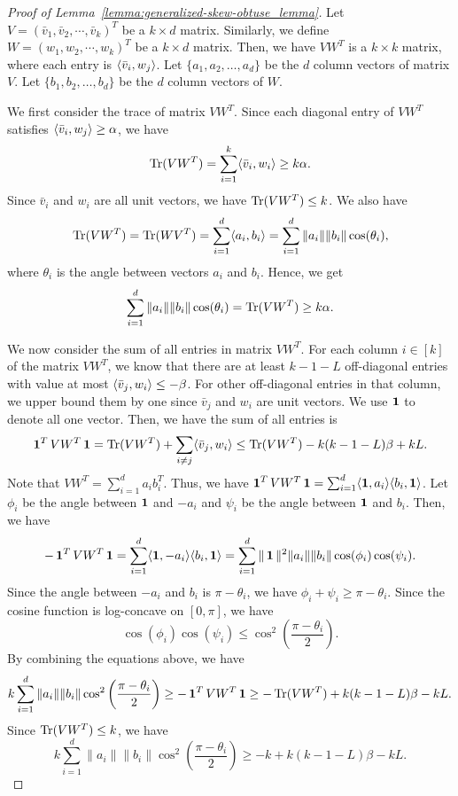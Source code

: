 \begin{proof}[Proof of Lemma~\ref{lemma:generalized-skew-obtuse_lemma}]
    Let $V= (\bar{v}_1,\bar{v}_2,\cdots, \bar{v}_k)^T$ be a $k\times d$ matrix. 
    Similarly, we define $W = (w_1,w_2,\cdots, w_k)^T$ be a $k\times d$ matrix. Then, we have $VW^T$ is a $k\times k$ matrix, where each entry is $\langle \bar{v}_i, w_j\rangle$. 
    Let $\{a_1, a_2, \dots, a_d\}$ be the $d$ column vectors of matrix $V$. Let $\{b_1,b_2,\dots, b_d\}$ be the $d$ column vectors of $W$.

    We first consider the trace of matrix $VW^T$. Since each diagonal entry of $VW^T$ satisfies $\langle \bar{v}_i, w_j\rangle \geq \alpha$, we have 
    $$
    \operatorname{Tr}(VW^T) = \sum_{i=1}^k \langle \bar{v}_i, w_i\rangle \geq k \alpha.
    $$
    Since $\bar{v}_i$ and $w_i$ are all unit vectors, we have $\operatorname{Tr}(VW^T) \leq k$.
    We also have 
    $$
    \operatorname{Tr}(VW^T) = \operatorname{Tr}(WV^T) = \sum_{i=1}^d \langle a_i, b_i\rangle = \sum_{i=1}^d \|a_i\|\|b_i\|\cos(\theta_i),
    $$
    where $\theta_i$ is the angle between vectors $a_i$ and $b_i$. Hence, we get
    \begin{equation}\label{eq:robust-trace}
    \sum_{i=1}^d \|a_i\|\|b_i\|\cos(\theta_i) = \operatorname{Tr}(VW^T) \geq k\alpha.
    \end{equation}

    We now consider the sum of all entries in matrix $VW^T$. 
    For each column $i \in [k]$ of the matrix $VW^T$, we know that there are at least $k-1-L$ off-diagonal entries with value at most $\langle \bar{v}_j, w_i\rangle \leq -\beta$.
    For other off-diagonal entries in that column, we upper bound them by one since $\bar{v}_j$ and $w_i$ are unit vectors.
    We use $\operatorname{\mathbf{1}}$ to denote all one vector. Then, we have the sum of all entries is
    $$
    \operatorname{\mathbf{1}}^T VW^T \operatorname{\mathbf{1}} = \operatorname{Tr}(VW^T) + \sum_{i\neq j} \langle \bar{v}_j, w_i\rangle \leq \operatorname{Tr}(VW^T) - k(k-1 -L)\beta + kL.
    $$
    Note that $VW^T = \sum_{i=1}^d a_i b_i^T$. Thus, we have $\operatorname{\mathbf{1}}^T VW^T \operatorname{\mathbf{1}} = \sum_{i=1}^d \langle \operatorname{\mathbf{1}}, a_i\rangle \langle b_i, \operatorname{\mathbf{1}}\rangle$. Let $\phi_i$ be the angle between $\operatorname{\mathbf{1}}$ and $-a_i$ and $\psi_i$ be the angle between $\operatorname{\mathbf{1}}$ and $b_i$. Then, we have 
    $$
    - \operatorname{\mathbf{1}}^T VW^T \operatorname{\mathbf{1}} = \sum_{i=1}^d \langle \operatorname{\mathbf{1}}, -a_i\rangle \langle b_i, \operatorname{\mathbf{1}}\rangle = \sum_{i=1}^d \|\operatorname{\mathbf{1}}\|^2 \|a_i\|\|b_i\| \cos(\phi_i) \cos(\psi_i). 
    $$
    Since the angle between $-a_i$ and $b_i$ is $\pi - \theta_i$, we have $\phi_i + \psi_i \geq \pi - \theta_i$. Since the cosine function is log-concave on $[0,\pi]$, we have 
    $$
    \cos(\phi_i) \cos(\psi_i) \leq \cos^2\left(\frac{\pi-\theta_i}{2}\right).
    $$
    By combining the equations above, we have
    \begin{align*}
    k \sum_{i=1}^d \|a_i\|\|b_i\| \cos^2\left(\frac{\pi-\theta_i}{2}\right) \geq - \operatorname{\mathbf{1}}^T VW^T \operatorname{\mathbf{1}} \geq - \operatorname{Tr}(VW^T) + k(k-1-L)\beta - kL.
    \end{align*}
    Since $\operatorname{Tr}(VW^T) \leq k$, we have
    \begin{equation}\label{eq:robust-all-sum}
        k \sum_{i=1}^d \|a_i\|\|b_i\| \cos^2\left(\frac{\pi-\theta_i}{2}\right) \geq -k+k(k-1-L)\beta - kL.
    \end{equation}


\end{proof}
